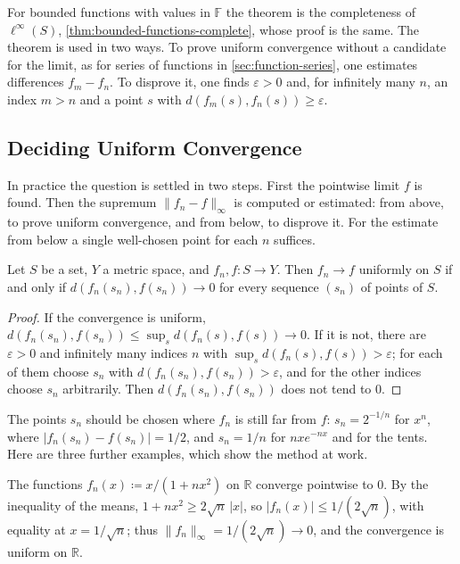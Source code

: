 For bounded functions with values in $\mathbb F$ the theorem is the completeness of $\ell^\infty(S)$, \cref{thm:bounded-functions-complete}, whose proof is the same. The theorem is used in two ways. To prove uniform convergence without a candidate for the limit, as for series of functions in \cref{sec:function-series}, one estimates differences $f_m-f_n$. To disprove it, one finds $\varepsilon>0$ and, for infinitely many $n$, an index $m>n$ and a point $s$ with $d(f_m(s),f_n(s))\ge\varepsilon$.

\subsection{Deciding Uniform Convergence}

In practice the question is settled in two steps. First the pointwise limit $f$ is found. Then the supremum $\|f_n-f\|_\infty$ is computed or estimated: from above, to prove uniform convergence, and from below, to disprove it. For the estimate from below a single well-chosen point for each $n$ suffices.

\begin{proposition}
\label{prop:sequential-test}
Let $S$ be a set, $Y$ a metric space, and $f_n,f\colon S\to Y$. Then $f_n\to f$ uniformly on $S$ if and only if $d(f_n(s_n),f(s_n))\to0$ for every sequence $(s_n)$ of points of $S$.
\end{proposition}

\begin{proof}
If the convergence is uniform, $d(f_n(s_n),f(s_n))\le\sup_sd(f_n(s),f(s))\to0$. If it is not, there are $\varepsilon>0$ and infinitely many indices $n$ with $\sup_sd(f_n(s),f(s))>\varepsilon$; for each of them choose $s_n$ with $d(f_n(s_n),f(s_n))>\varepsilon$, and for the other indices choose $s_n$ arbitrarily. Then $d(f_n(s_n),f(s_n))$ does not tend to $0$.
\end{proof}

The points $s_n$ should be chosen where $f_n$ is still far from $f$: $s_n=2^{-1/n}$ for $x^n$, where $|f_n(s_n)-f(s_n)|=1/2$, and $s_n=1/n$ for $nxe^{-nx}$ and for the tents. Here are three further examples, which show the method at work.

The functions $f_n(x)\coloneqq x/(1+nx^2)$ on $\mathbb R$ converge pointwise to $0$. By the inequality of the means, $1+nx^2\ge2\sqrt n\,|x|$, so $|f_n(x)|\le1/(2\sqrt n)$, with equality at $x=1/\sqrt n$; thus $\|f_n\|_\infty=1/(2\sqrt n)\to0$, and the convergence is uniform on $\mathbb R$.

